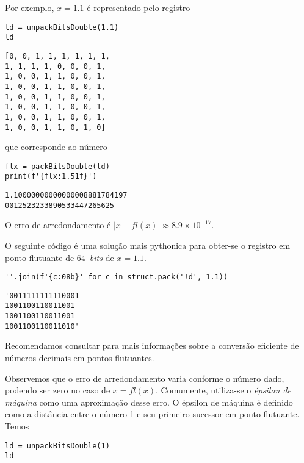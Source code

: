 Por exemplo, $x = 1.1$ é representado pelo registro

\begin{lstlisting}
ld = unpackBitsDouble(1.1)
ld
\end{lstlisting}

\begin{verbatim}
[0, 0, 1, 1, 1, 1, 1, 1,
1, 1, 1, 1, 0, 0, 0, 1,
1, 0, 0, 1, 1, 0, 0, 1,
1, 0, 0, 1, 1, 0, 0, 1,
1, 0, 0, 1, 1, 0, 0, 1,
1, 0, 0, 1, 1, 0, 0, 1,
1, 0, 0, 1, 1, 0, 0, 1,
1, 0, 0, 1, 1, 0, 1, 0]
\end{verbatim}

que corresponde ao número

\begin{lstlisting}
flx = packBitsDouble(ld)
print(f'{flx:1.51f}')
\end{lstlisting}

\begin{verbatim}
1.10000000000000008881784197
0012523233890533447265625  
\end{verbatim}

O erro de arredondamento é $|x - fl(x)| \approx 8.9\times 10^{-17}$.

\begin{obs}\label{obs:unpackBitsDouble}
  O seguinte código é uma solução mais pythonica para obter-se o registro em ponto flutuante de 64~{\it bits} de $x = 1.1$.

\begin{lstlisting}
''.join(f'{c:08b}' for c in struct.pack('!d', 1.1))
\end{lstlisting}

\begin{verbatim}
'0011111111110001
1001100110011001
1001100110011001
1001100110011010'  
\end{verbatim}

  Recomendamos consultar \cite{Lemire2021a} para mais informações sobre a conversão eficiente de números decimais em pontos flutuantes.
\end{obs}

Observemos que o erro de arredondamento varia conforme o número dado, podendo ser zero no caso de $x = fl(x)$. Comumente, utiliza-se o \emph{épsilon de máquina} como uma aproximação desse erro. O épsilon de máquina é definido como a distância entre o número 1 e seu primeiro sucessor em ponto flutuante. Temos

\begin{lstlisting}
ld = unpackBitsDouble(1)
ld
\end{lstlisting}

